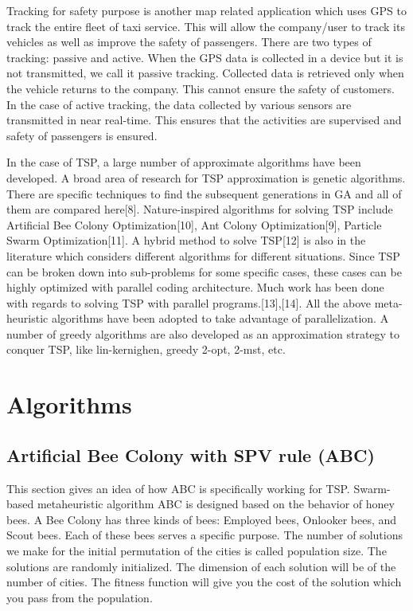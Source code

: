 \documentclass[conference]{IEEEtran}
\begin{document}
Tracking for safety purpose is another map related application which uses GPS to track the entire fleet of taxi service. This will allow the company/user to track its vehicles as well as improve the safety of passengers. There are two types of tracking: passive and active. When the GPS data is collected in a device but it is not transmitted, we call it passive tracking. Collected data is retrieved only when the vehicle returns to the company. This cannot ensure the safety of customers. In the case of active tracking, the data collected by various sensors are transmitted in near real-time. This ensures that the activities are supervised and safety of passengers is ensured.  

In the case of TSP, a large number of approximate algorithms have been developed. A broad area of research for TSP approximation is genetic algorithms. There are specific techniques to find the subsequent generations in GA and all of them are compared here[8]. Nature-inspired algorithms for solving TSP include Artificial Bee Colony Optimization[10], Ant Colony Optimization[9], Particle Swarm Optimization[11]. A hybrid method to solve TSP[12] is also in the literature which considers different algorithms for different situations. Since TSP can be broken down into sub-problems for some specific cases, these cases can be highly optimized with parallel coding architecture. Much work has been done with regards to solving TSP with parallel programs.[13],[14]. All the above meta-heuristic algorithms have been adopted to take advantage of parallelization. A number of greedy algorithms are also developed as an approximation strategy to conquer TSP, like lin-kernighen, greedy 2-opt, 2-mst, etc. 


\section{Algorithms}
\subsection {Artificial Bee Colony with SPV rule (ABC)}
This section gives an idea of how ABC is specifically working for TSP. Swarm-based metaheuristic algorithm ABC is designed based on the behavior of honey bees. A Bee Colony has three kinds of bees: Employed bees, Onlooker bees, and Scout bees. Each of these bees serves a specific purpose. The number of solutions we make for the initial permutation of the cities is called population size. The solutions are randomly initialized. The dimension of each solution will be of the number of cities. The fitness function will give you the cost of the solution which you pass from the population. 
\end{document}
